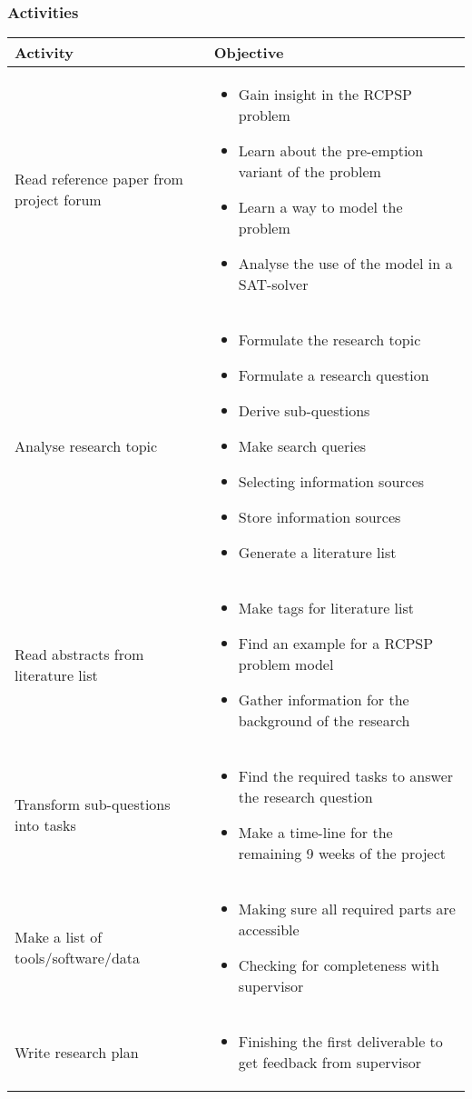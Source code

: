 \documentclass[english]{article}
\begin{document}
\subsubsection{Activities}
\begin{tabular}{ l p{}}
  \hline			
  Activity & Objective \\
  \hline\hline
  Read reference paper from project forum & {\begin{itemize}
    \item Gain insight in the RCPSP problem
    \item Learn about the pre-emption variant of the problem
    \item Learn a way to model the problem
    \item Analyse the use of the model in a SAT-solver
\end{itemize}{}}  \\
  Analyse research topic & {\begin{itemize}
    \item Formulate the research topic
    \item Formulate a research question
    \item Derive sub-questions
    \item Make search queries
    \item Selecting information sources
    \item Store information sources
    \item Generate a literature list
\end{itemize}{}} \\
  Read abstracts from literature list & {\begin{itemize}
    \item Make tags for literature list
    \item Find an example for a RCPSP problem model
    \item Gather information for the background of the research
\end{itemize}{}} \\
  Transform sub-questions into tasks & {\begin{itemize}
    \item Find the required tasks to answer the research question
    \item Make a time-line for the remaining 9 weeks of the project
\end{itemize}{}} \\
  Make a list of tools/software/data & {\begin{itemize}
    \item Making sure all required parts are accessible
    \item Checking for completeness with supervisor
\end{itemize}{}} \\
  Write research plan & {\begin{itemize}
    \item Finishing the first deliverable to get feedback from supervisor
\end{itemize}{}} \\
  \hline  
\end{tabular}
\end{document}
